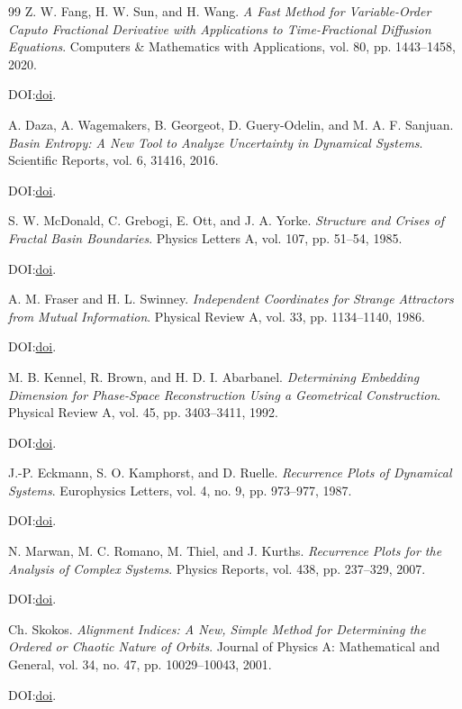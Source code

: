 \documentclass[11pt]{article}
\begin{document}
\begin{thebibliography}{99}
Z. W. Fang, H. W. Sun, and H. Wang.
\emph{A Fast Method for Variable-Order Caputo Fractional Derivative with Applications to Time-Fractional Diffusion Equations}.
Computers \& Mathematics with Applications, vol. 80, pp. 1443--1458, 2020.
\par\noindent DOI:\@ \href{https://doi.org/10.1016/j.camwa.2020.07.009}{doi}.

A. Daza, A. Wagemakers, B. Georgeot, D. Guery-Odelin, and
M. A. F. Sanjuan.
\emph{Basin Entropy: A New Tool to Analyze Uncertainty in Dynamical Systems}.
Scientific Reports, vol. 6, 31416, 2016.
\par\noindent DOI:\@ \href{https://doi.org/10.1038/srep31416}{doi}.

S. W. McDonald, C. Grebogi, E. Ott, and J. A. Yorke.
\emph{Structure and Crises of Fractal Basin Boundaries}.
Physics Letters A, vol. 107, pp. 51--54, 1985.
\par\noindent DOI:\@ \href{https://doi.org/10.1016/0375-9601(85)90193-8}{doi}.

A. M. Fraser and H. L. Swinney.
\emph{Independent Coordinates for Strange Attractors from Mutual Information}.
Physical Review A, vol. 33, pp. 1134--1140, 1986.
\par\noindent DOI:\@ \href{https://doi.org/10.1103/PhysRevA.33.1134}{doi}.

M. B. Kennel, R. Brown, and H. D. I. Abarbanel.
\emph{Determining Embedding Dimension for Phase-Space Reconstruction Using a Geometrical Construction}.
Physical Review A, vol. 45, pp. 3403--3411, 1992.
\par\noindent DOI:\@ \href{https://doi.org/10.1103/PhysRevA.45.3403}{doi}.

J.-P. Eckmann, S. O. Kamphorst, and D. Ruelle.
\emph{Recurrence Plots of Dynamical Systems}.
Europhysics Letters, vol. 4, no. 9, pp. 973--977, 1987.
\par\noindent DOI:\@ \href{https://doi.org/10.1209/0295-5075/4/9/004}{doi}.

N. Marwan, M. C. Romano, M. Thiel, and J. Kurths.
\emph{Recurrence Plots for the Analysis of Complex Systems}.
Physics Reports, vol. 438, pp. 237--329, 2007.
\par\noindent DOI:\@ \href{https://doi.org/10.1016/j.physrep.2006.11.001}{doi}.

Ch. Skokos.
\emph{Alignment Indices: A New, Simple Method for Determining the Ordered or Chaotic Nature of Orbits}.
Journal of Physics A: Mathematical and General, vol. 34, no. 47,
pp. 10029--10043, 2001.
\par\noindent DOI:\@ \href{https://doi.org/10.1088/0305-4470/34/47/309}{doi}.


\end{thebibliography}
\end{document}
